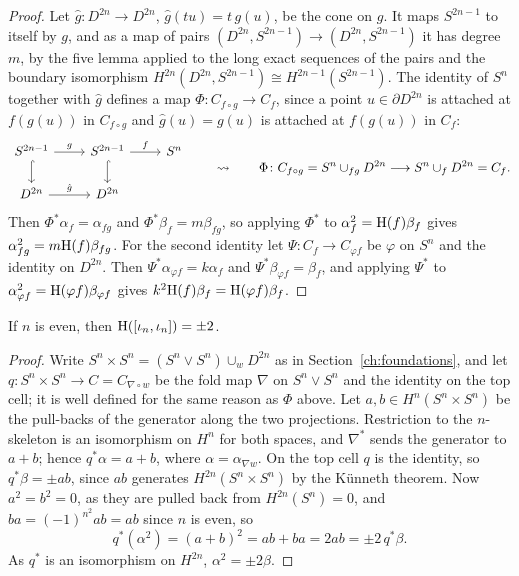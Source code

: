 \begin{proof}
Let $\hat g\colon D^{2n}\to D^{2n}$, $\hat g(tu)=t\,g(u)$, be the cone on $g$. It maps $S^{2n-1}$ to itself by $g$, and as a map of pairs $(D^{2n},S^{2n-1})\to(D^{2n},S^{2n-1})$ it has degree $m$, by the five lemma applied to the long exact sequences of the pairs and the boundary isomorphism $H^{2n}(D^{2n},S^{2n-1})\cong H^{2n-1}(S^{2n-1})$. The identity of $S^n$ together with $\hat g$ defines a map $\Phi\colon C_{f\circ g}\to C_f$, since a point $u\in\partial D^{2n}$ is attached at $f(g(u))$ in $C_{f\circ g}$ and $\hat g(u)=g(u)$ is attached at $f(g(u))$ in $C_f$:
\[
\begin{tikzcd}
S^{2n-1}\arrow[r,"g"]\arrow[d,hook] & S^{2n-1}\arrow[d,hook]\arrow[r,"f"] & S^n\\
D^{2n}\arrow[r,"\hat g"] & D^{2n} &
\end{tikzcd}
\qquad\leadsto\qquad
\Phi\colon C_{f\circ g}=S^n\cup_{fg}D^{2n}\longrightarrow S^n\cup_fD^{2n}=C_f .
\]
Then $\Phi^*\alpha_f=\alpha_{fg}$ and $\Phi^*\beta_f=m\beta_{fg}$, so applying $\Phi^*$ to $\alpha_f^2=\mathrm{H}(f)\beta_f$ gives $\alpha_{fg}^2=m\mathrm{H}(f)\beta_{fg}$. For the second identity let $\Psi\colon C_f\to C_{\varphi f}$ be $\varphi$ on $S^n$ and the identity on $D^{2n}$. Then $\Psi^*\alpha_{\varphi f}=k\alpha_f$ and $\Psi^*\beta_{\varphi f}=\beta_f$, and applying $\Psi^*$ to $\alpha_{\varphi f}^2=\mathrm{H}(\varphi f)\beta_{\varphi f}$ gives $k^2\mathrm{H}(f)\beta_f=\mathrm{H}(\varphi f)\beta_f$.
\end{proof}

\begin{proposition}\label{prop:whiteheadH}
If $n$ is even, then $\mathrm{H}([\iota_n,\iota_n])=\pm2$.
\end{proposition}

\begin{proof}
Write $S^n\times S^n=(S^n\vee S^n)\cup_wD^{2n}$ as in Section~\ref{ch:foundations}, and let $q\colon S^n\times S^n\to C=C_{\nabla\circ w}$ be the fold map $\nabla$ on $S^n\vee S^n$ and the identity on the top cell; it is well defined for the same reason as $\Phi$ above. Let $a,b\in H^n(S^n\times S^n)$ be the pull-backs of the generator along the two projections. Restriction to the $n$-skeleton is an isomorphism on $H^n$ for both spaces, and $\nabla^*$ sends the generator to $a+b$; hence $q^*\alpha=a+b$, where $\alpha=\alpha_{\nabla w}$. On the top cell $q$ is the identity, so $q^*\beta=\pm ab$, since $ab$ generates $H^{2n}(S^n\times S^n)$ by the K\"unneth theorem. Now $a^2=b^2=0$, as they are pulled back from $H^{2n}(S^n)=0$, and $ba=(-1)^{n^2}ab=ab$ since $n$ is even, so
\[
q^*(\alpha^2)=(a+b)^2=ab+ba=2ab=\pm2\,q^*\beta .
\]
As $q^*$ is an isomorphism on $H^{2n}$, $\alpha^2=\pm2\beta$.
\end{proof}

